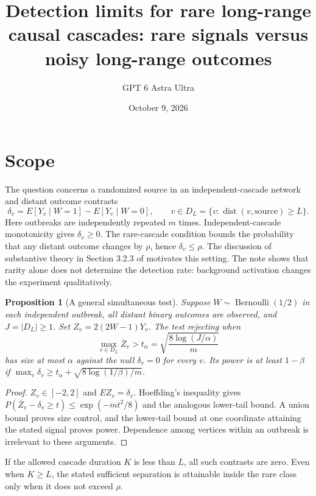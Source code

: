\documentclass[11pt]{article}
\title{Detection limits for rare long-range causal cascades: rare signals versus noisy long-range outcomes}
\author{GPT 6 Astra Ultra}
\date{October 9, 2026}
\newtheorem{proposition}[theorem]{Proposition}
\theoremstyle{remark}
\begin{document}
\maketitle

\section*{Scope}
The question concerns a randomized source in an independent-cascade network and distant outcome contrasts
\[
 \delta_v=E[Y_v\mid W=1]-E[Y_v\mid W=0],\qquad
 v\in D_L=\{v:\operatorname{dist}(v,\text{source})\ge L\}.
\]
Here outbreaks are independently repeated $m$ times. Independent-cascade monotonicity gives $\delta_v\ge0$. The rare-cascade condition bounds the probability that any distant outcome changes by $\rho$, hence $\delta_v\le\rho$. The discussion of substantive theory in Section 3.2.3 of \cite{agenda} motivates this setting. The note shows that rarity alone does not determine the detection rate: background activation changes the experiment qualitatively.

\begin{proposition}[A general simultaneous test]
Suppose $W\sim\operatorname{Bernoulli}(1/2)$ in each independent outbreak, all distant binary outcomes are observed, and $J=|D_L|\ge1$. Set $Z_v=2(2W-1)Y_v$. The test rejecting when
\[
 \max_{v\in D_L}\overline Z_v>
 t_\alpha=\sqrt{\frac{8\log(J/\alpha)}m}
\]
has size at most $\alpha$ against the null $\delta_v=0$ for every $v$. Its power is at least $1-\beta$ if
$\max_v\delta_v\ge t_\alpha+\sqrt{8\log(1/\beta)/m}$.
\end{proposition}
\begin{proof}
$Z_v\in[-2,2]$ and $EZ_v=\delta_v$. Hoeffding's inequality gives
$P(\overline Z_v-\delta_v\ge t)\le\exp(-mt^2/8)$ and the analogous lower-tail bound. A union bound proves size control, and the lower-tail bound at one coordinate attaining the stated signal proves power. Dependence among vertices within an outbreak is irrelevant to these arguments.
\end{proof}
If the allowed cascade duration $K$ is less than $L$, all such contrasts are zero. Even when $K\ge L$, the stated sufficient separation is attainable inside the rare class only when it does not exceed $\rho$.
\end{document}
